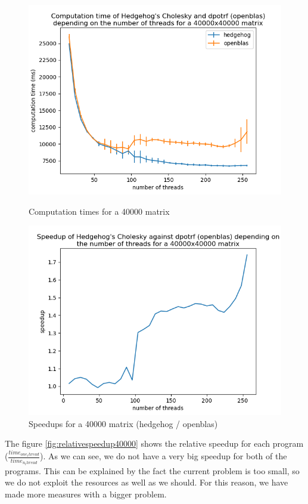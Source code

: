 \begin{figure}[!htb]
  \begin{minipage}{0.48\linewidth}
    \centering
    \includegraphics[scale=0.5]{img/times-40000.png}
    \caption{Computation times for a 40000 matrix}
    \label{fig:time40000}
  \end{minipage}\hfill
  \begin{minipage}{0.48\linewidth}
    \centering
    \includegraphics[scale=0.5]{img/speedup-40000.png}
    \caption{Speedups for a 40000 matrix (hedgehog / openblas)}
    \label{fig:speedups40000}
  \end{minipage}
\end{figure}

The figure \ref{fig:relativespeedup40000} shows the relative speedup for each
program ($\frac{time_{one_thread}}{time_{n_thread}}$). As we can see, we do not
have a very big speedup for both of the programs. This can be explained by the
fact the current problem is too small, so we do not exploit the resources as
well as we should. For this reason, we have made more measures with a bigger
problem.

